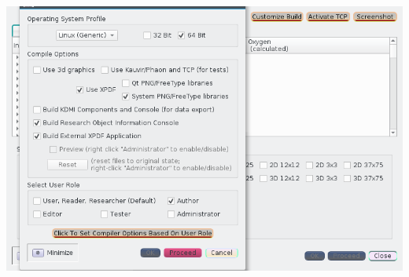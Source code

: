 \begin{frame}{}
\begin{annotatedFigure}{0pt}{0pt}{\includegraphics[scale=1.5]{texs/config.png}}
        
      
  
        \end{annotatedFigure}


    \end{frame}


